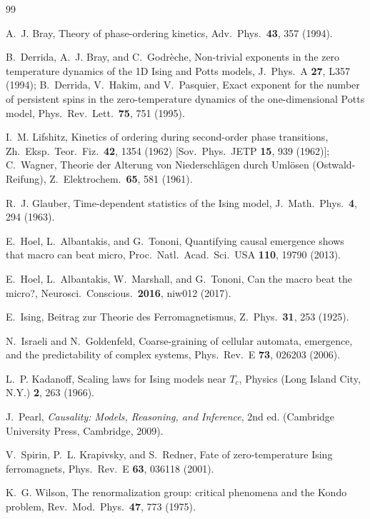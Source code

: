\documentclass[aps,pre,preprint,superscriptaddress,showpacs]{revtex4-2}
\begin{document}
\begin{thebibliography}{99}

A.~J. Bray,
Theory of phase-ordering kinetics,
Adv.\ Phys.\ \textbf{43}, 357 (1994).

B.~Derrida, A.~J. Bray, and C.~Godr\`{e}che,
Non-trivial exponents in the zero temperature dynamics of the 1D Ising and Potts models,
J.\ Phys.\ A \textbf{27}, L357 (1994);
B.~Derrida, V.~Hakim, and V.~Pasquier,
Exact exponent for the number of persistent spins in the zero-temperature dynamics of the one-dimensional Potts model,
Phys.\ Rev.\ Lett.\ \textbf{75}, 751 (1995).

I.~M. Lifshitz,
Kinetics of ordering during second-order phase transitions,
Zh.\ Eksp.\ Teor.\ Fiz.\ \textbf{42}, 1354 (1962)
[Sov.\ Phys.\ JETP \textbf{15}, 939 (1962)];
C.~Wagner,
Theorie der Alterung von Niederschl\"{a}gen durch Uml\"{o}sen (Ostwald-Reifung),
Z.\ Elektrochem.\ \textbf{65}, 581 (1961).

R.~J. Glauber,
Time-dependent statistics of the Ising model,
J.\ Math.\ Phys.\ \textbf{4}, 294 (1963).

E.~Hoel, L.~Albantakis, and G.~Tononi,
Quantifying causal emergence shows that macro can beat micro,
Proc.\ Natl.\ Acad.\ Sci.\ USA \textbf{110}, 19790 (2013).

E.~Hoel, L.~Albantakis, W.~Marshall, and G.~Tononi,
Can the macro beat the micro?,
Neurosci.\ Conscious.\ \textbf{2016}, niw012 (2017).

E.~Ising,
Beitrag zur Theorie des Ferromagnetismus,
Z.\ Phys.\ \textbf{31}, 253 (1925).

N.~Israeli and N.~Goldenfeld,
Coarse-graining of cellular automata, emergence, and the predictability of complex systems,
Phys.\ Rev.\ E \textbf{73}, 026203 (2006).

L.~P. Kadanoff,
Scaling laws for Ising models near $T_c$,
Physics (Long Island City, N.Y.) \textbf{2}, 263 (1966).

J.~Pearl,
\textit{Causality: Models, Reasoning, and Inference}, 2nd ed.
(Cambridge University Press, Cambridge, 2009).

V.~Spirin, P.~L. Krapivsky, and S.~Redner,
Fate of zero-temperature Ising ferromagnets,
Phys.\ Rev.\ E \textbf{63}, 036118 (2001).

K.~G. Wilson,
The renormalization group: critical phenomena and the Kondo problem,
Rev.\ Mod.\ Phys.\ \textbf{47}, 773 (1975).


\end{thebibliography}
\end{document}
